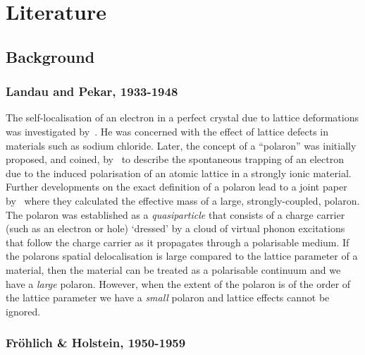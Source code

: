 \clearpage{}

\pagestyle{body}

\chapter{Literature}
\label{chap:second}



\section{Background}

\subsection{Landau and Pekar, 1933-1948}

The self-localisation of an electron in a perfect crystal due to lattice deformations was investigated by~\cite{landau_motion_1933}. He was concerned with the effect of lattice defects in materials such as sodium chloride. Later, the concept of a ``polaron'' was initially proposed, and coined, by~\cite{pekar_local_1946, pekar_notitle_1946, pekar_notitle_1947} to describe the spontaneous trapping of an electron due to the induced polarisation of an atomic lattice in a strongly ionic material. Further developments on the exact definition of a polaron lead to a joint paper by~\cite{pekar_effective_1948} where they calculated the effective mass of a large,  strongly-coupled, polaron. The polaron was established as a \emph{quasiparticle} that consists of a charge carrier (such as an electron or hole) `dressed' by a cloud of virtual phonon excitations that follow the charge carrier as it propagates through a polarisable medium. If the polarons spatial delocalisation is large compared to the lattice parameter of a material, then the material can be treated as a polarisable continuum and we have a \emph{large} polaron. However, when the extent of the polaron is of the order of the lattice parameter we have a \emph{small} polaron and lattice effects cannot be ignored.

\subsection{Fr\"ohlich \& Holstein, 1950-1959}

